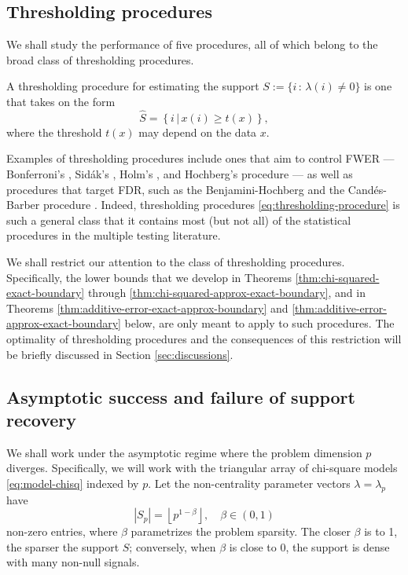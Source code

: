 \subsection{Thresholding procedures}
\label{subsec:thresholding-procedures}

We shall study the performance of five procedures,
all of which belong to the broad class of thresholding procedures.
\begin{definition}
A thresholding procedure for estimating the support 
$S:=\{i\, :\, \lambda(i)\neq0\}$ is one that takes on the form
\begin{equation} \label{eq:thresholding-procedure}
    \widehat{S} = \left\{i\,|\,x(i) \ge t(x)\right\},
\end{equation}
where the threshold $t(x)$ may depend on the data $x$.
\end{definition}
Examples of thresholding procedures include ones that aim to control FWER --- Bonferroni's \cite{dunn1961multiple}, Sid\'ak's \citep{vsidak1967rectangular}, Holm's \citep{holm1979simple}, and Hochberg's procedure \citep{hochberg1988sharper} --- as well as procedures that target FDR, such as the Benjamini-Hochberg \cite{benjamini1995controlling} and the Cand\'es-Barber procedure \cite{barber2015controlling}.
Indeed, thresholding procedures \eqref{eq:thresholding-procedure} is such a general class that it contains most (but not all) of the statistical procedures in the multiple testing literature.

We shall restrict our attention to the class of thresholding procedures.
Specifically, the lower bounds that we develop in Theorems \ref{thm:chi-squared-exact-boundary} through \ref{thm:chi-squared-approx-exact-boundary}, and in Theorems \ref{thm:additive-error-exact-approx-boundary} and \ref{thm:additive-error-approx-exact-boundary} below, are only meant to apply to such procedures. 
The optimality of thresholding procedures and the consequences of this restriction will be briefly discussed in Section \ref{sec:discussions}.

\subsection{Asymptotic success and failure of support recovery}
\label{subsec:asymptotics}

We shall work under the asymptotic regime where the problem dimension $p$ diverges.
Specifically, we will work with the triangular array of chi-square models \eqref{eq:model-chisq} indexed by $p$.
Let the non-centrality parameter vectors $\lambda = \lambda_p$ have 
\begin{equation} \label{eq:signal-sparsity}
    |S_p| = \left\lfloor p^{1-\beta} \right\rfloor, \quad \beta\in(0,1)
\end{equation}
non-zero entries, where $\beta$ parametrizes the problem sparsity.
The closer $\beta$ is to 1, the sparser the support $S$; conversely, when $\beta$ is close to 0, the support is dense with many non-null signals.

